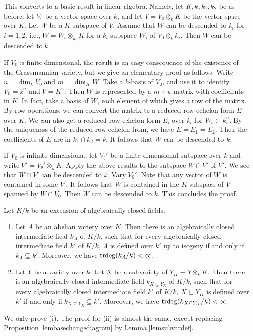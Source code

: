 This converts to a basic result in linear algebra.
Namely, let $K,k,k_1,k_2$ be as before, let $V_0$ be a vector space over $k$, and let $V=V_0\otimes_kK$ be the vector space over $K$.
Let $W$ be a $K$-subspace of $V$.
Assume that $W$ can be descended to $k_i$ for $i=1,2$; i.e.,
$W=W_i\otimes_{k_i}K$ for a $k_i$-subspace $W_i$ of $V_0\otimes_kk_i$.
Then $W$ can be descended to $k$.

If $V_0$ is finite-dimensional, the result is an easy consequence of the existence of the Grassmannian variety, but we give an elementary proof as follows.
Write $n=\dim_k V_0$ and $m=\dim_K W$.
Take a $k$-basis of $V_0$, and use it to identify $V_0=k^n$ and $V=K^n$.
Then $W$ is represented by a $m\times n$ matrix with coefficients in $K$.
In fact, take a basis of $W$, each element of which gives a row of the matrix.
By row operations, we can convert the matrix to a reduced row echelon form $E$ over $K$.
We can also get a reduced row echelon form $E_i$ over $k_i$ for $W_i\subset k_i^n$.
By the uniqueness of the reduced row echelon from, we have $E=E_1=E_2$. Then the coefficients of $E$
are in $k_1\cap k_2=k$.
It follows that $W$ can be descended to $k$.

If $V_0$ is infinite-dimensional, let $V_0'$ be a finite-dimensional subspace over $k$ and write $V'=V_0'\otimes_kK$.
Apply the above results to the subspace $W\cap V'$ of $V'$.
We see that $W\cap V'$ can be descended to $k$.
Vary $V_0'$. Note that any vector of $W$ is contained in some $V'$.
It follows that $W$ is contained in the $K$-subspace of $V$ spanned by $W\cap V_0$.
Then $W$ can be descended to $k$.
This concludes the proof.
\endproof





\begin{cor}
\notready\label{cordeffield}
Let $K/k$ be an extension of algebraically closed fields.
\begin{enumerate}
\item Let $A$ be an abelian variety over $K.$
Then there is an algebraically closed intermediate field $k_A$ of $K/k$, such that for every algebraically closed intermediate field $k'$ of $K/k$,
$A$ is defined over $k'$ up to isogeny if and only if $k_A\subseteq k'.$
Moreover, we have ${\mathrm{trdeg}}(k_A/k)<\infty.$
\item Let $Y$ be a variety over $k$. Let $X$ be a subvariety of $Y_K=Y\otimes_kK.$
Then there is an algebraically closed intermediate field $k_{X\subseteq Y_K}$ of $K/k$, such that for every algebraically closed intermediate field $k'$ of $K/k$,
$X\subseteq Y_K$ is defined over $k'$ if and only if $k_{X\subseteq Y_K}\subseteq k'.$
Moreover, we have ${\mathrm{trdeg}}(k_{X\subseteq Y_K}/k)<\infty.$
\end{enumerate}
\end{cor}
\proof
We only prove (i). The proof for (ii) is almost the same, except replacing  Proposition \ref{lembasechangediagram} by Lemma \ref{lemsubvardef}.

